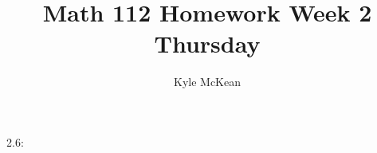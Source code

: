 \documentclass[11pt]{article}
\author{Kyle McKean}
\title{Math 112 Homework Week 2 Thursday}
\begin{document}
\maketitle
\begin{description}
  \item[2.6:]

\end{description} 
\end{document}
